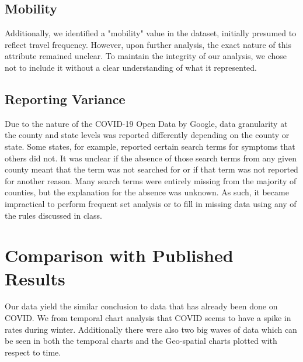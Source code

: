 \documentclass[sigconf,screen,nonacm]{acmart}
\begin{document}
\subsection{Mobility}
Additionally, we identified a "mobility" value in the dataset, initially presumed to reflect travel frequency. However, upon further analysis, the exact nature of this attribute remained unclear. To maintain the integrity of our analysis, we chose not to include it without a clear understanding of what it represented.

\subsection{Reporting Variance}
Due to the nature of the COVID-19 Open Data by Google, data granularity at the county and state levels was reported differently depending on the county or state. Some states, for example, reported certain search terms for symptoms that others did not. It was unclear if the absence of those search terms from any given county meant that the term was not searched for or if that term was not reported for another reason. Many search terms were entirely missing from the majority of counties, but the explanation for the absence was unknown. As such, it became impractical to perform frequent set analysis or to fill in missing data using any of the rules discussed in class.



\section{Comparison with Published Results}
Our data yield the similar conclusion to data that has already been done on COVID. We from temporal chart analysis that COVID seems to have a spike in rates during winter. Additionally there were also two big waves of data which can be seen in both the temporal charts and the Geo-spatial charts plotted with respect to time.






\newpage


\end{document}
